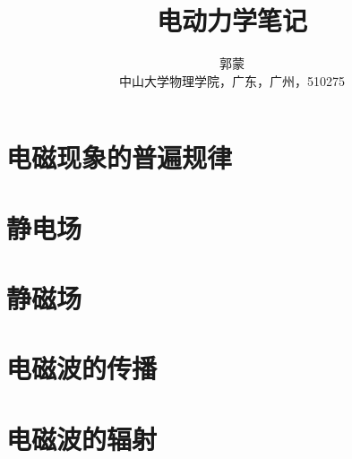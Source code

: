 \documentclass[10pt,oneside,UTF8]{book}
\title{\fontsize{30pt}{30pt}\textbf{电动力学笔记}}
\author
	{\kaishu 郭蒙 \\
	\kaishu 中山大学物理学院，广东，广州，510275} %
\date{}
\begin{document}
	\maketitle  %
\newpage
{}
\setcounter{page}{1}
\tableofcontents
\newpage
\setcounter{page}{1}
	\chapter{电磁现象的普遍规律}
		
	\chapter{静电场}

	\chapter{静磁场}
	
	\chapter{电磁波的传播}
		
	\chapter{电磁波的辐射}
		

\end{document}
